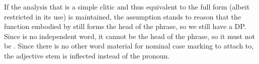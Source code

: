 If the analysis that  is a simple clitic and thus equivalent to
the full form  (albeit restricted in its use) is maintained,
the assumption stands to reason that the function embodied by 
still forms the head of the phrase, so we still have a DP. Since 
is no independent word, it cannot be the head of the phrase, so it must not be
. Since there is no other word material for nominal case marking to
attach to, the adjective stem is inflected instead of the pronoun.





